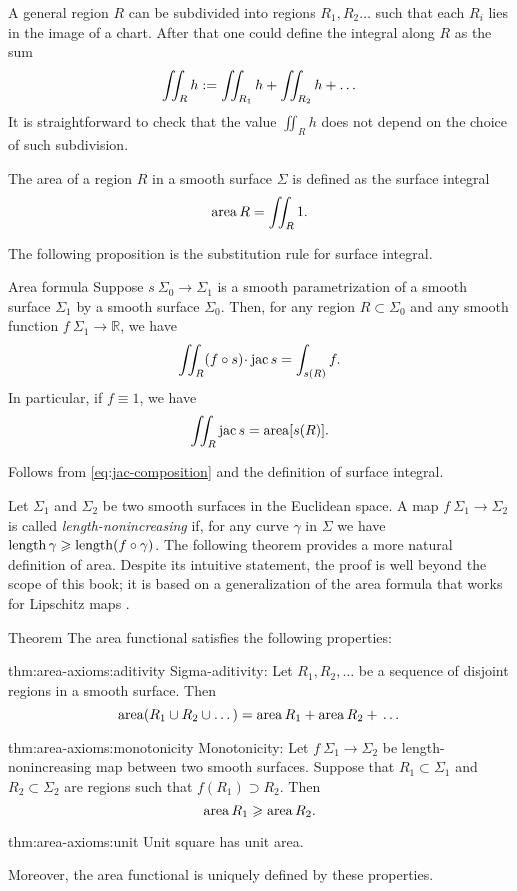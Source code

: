 A general region $R$ can be subdivided into regions $R_1,R_2\dots$ such that each $R_i$ lies in the image of a chart.
After that one could define the integral along $R$ as the sum
\[\iint_Rh
\mathrel{:=}
\iint_{R_1}h+\iint_{R_2}h+\dots\]
It is straightforward to check that the value $\iint_Rh$ does not depend on the choice of such subdivision.

The area of a region $R$ in a smooth surface $\Sigma$ is defined as the surface integral 
\[\mathop{\rm area}\nolimits R=\iint_R 1.\]

The following proposition is the substitution rule for surface integral.

\begin{thm}{Area formula}\label{prop:surface-integral}
Suppose $s\:\Sigma_0\to \Sigma_1$ is a smooth parametrization of a smooth surface $\Sigma_1$ by  a smooth surface $\Sigma_0$.
Then, for any region $R\subset \Sigma_0$ and any smooth function $f\:\Sigma_1\to\mathbb{R}$, we have
\[\iint_R (f\circ s)\cdot \jac  s=\int_{s(R)}f.\]
In particular, if $f\equiv 1$, we have
\[\iint_R \mathop{\rm jac}\nolimits  s=\mathop{\rm area}\nolimits [s(R)].\]

\end{thm}

Follows from \ref{eq:jac-composition} and the definition of surface integral.
\qeds

Let $\Sigma_1$ and $\Sigma_2$ be two smooth surfaces in the Euclidean space.
A map $f\:\Sigma_1\to \Sigma_2$ is called \emph{length-nonincreasing} if, for any curve $\gamma$ in $\Sigma$ we have $\mathop{\rm length}\nolimits\gamma\geqslant \mathop{\rm length}\nolimits (f\circ\gamma)$. 
The following theorem provides a more natural definition of area.
Despite its intuitive statement, the proof is well beyond the scope of this book;
it is based on a generalization of the area formula that works for Lipschitz maps \cite[3.2.3]{federer}.

\begin{thm}{Theorem}\label{thm:area-axioms}
The area functional satisfies the following properties:

\begin{subthm}{thm:area-axioms:aditivity}
Sigma-aditivity: 
Let $R_1,R_2,\dots$ be a sequence of disjoint regions in a smooth surface.
Then 
\[\mathop{\rm area}\nolimits (R_1\cup R_2\cup \dots)=\mathop{\rm area}\nolimits R_1+\mathop{\rm area}\nolimits R_2+{}\dots\]
\end{subthm}

\begin{subthm}{thm:area-axioms:monotonicity}
Monotonicity:
Let $f\:\Sigma_1\to \Sigma_2$ be length-nonincreasing map between two smooth surfaces.
Suppose that $R_1\subset \Sigma_1$ and $R_2\subset \Sigma_2$ are regions such that $f(R_1)\supset R_2$.
Then 
\[\mathop{\rm area}\nolimits R_1\geqslant \mathop{\rm area}\nolimits R_2.\]
\end{subthm}

\begin{subthm}{thm:area-axioms:unit}
Unit square has unit area. 
\end{subthm}

Moreover, the area functional is uniquely defined by these properties.
\end{thm}

